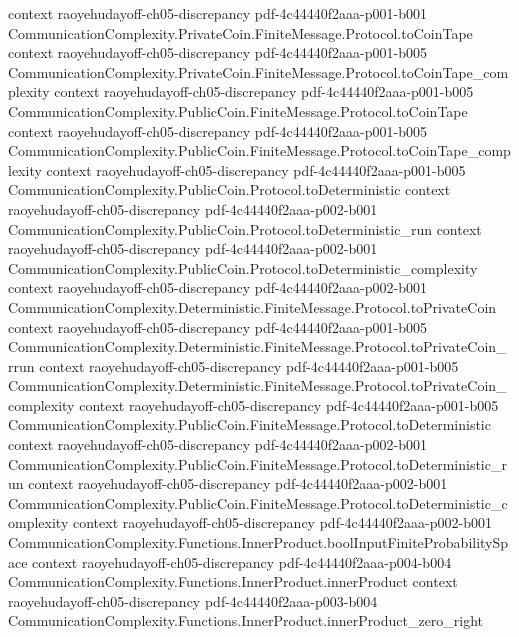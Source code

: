\begin{lemma}
  {context}
  {raoyehudayoff-ch05-discrepancy}
  {pdf-4c44440f2aaa-p001-b001}
\proofstep
  {CommunicationComplexity.PrivateCoin.FiniteMessage.Protocol.toCoinTape}
  {context}
  {raoyehudayoff-ch05-discrepancy}
  {pdf-4c44440f2aaa-p001-b005}
\proofstep
  {CommunicationComplexity.PrivateCoin.FiniteMessage.Protocol.toCoinTape_complexity}
  {context}
  {raoyehudayoff-ch05-discrepancy}
  {pdf-4c44440f2aaa-p001-b005}
\proofstep
  {CommunicationComplexity.PublicCoin.FiniteMessage.Protocol.toCoinTape}
  {context}
  {raoyehudayoff-ch05-discrepancy}
  {pdf-4c44440f2aaa-p001-b005}
\proofstep
  {CommunicationComplexity.PublicCoin.FiniteMessage.Protocol.toCoinTape_complexity}
  {context}
  {raoyehudayoff-ch05-discrepancy}
  {pdf-4c44440f2aaa-p001-b005}
\proofstep
  {CommunicationComplexity.PublicCoin.Protocol.toDeterministic}
  {context}
  {raoyehudayoff-ch05-discrepancy}
  {pdf-4c44440f2aaa-p002-b001}
\proofstep
  {CommunicationComplexity.PublicCoin.Protocol.toDeterministic_run}
  {context}
  {raoyehudayoff-ch05-discrepancy}
  {pdf-4c44440f2aaa-p002-b001}
\proofstep
  {CommunicationComplexity.PublicCoin.Protocol.toDeterministic_complexity}
  {context}
  {raoyehudayoff-ch05-discrepancy}
  {pdf-4c44440f2aaa-p002-b001}
\proofstep
  {CommunicationComplexity.Deterministic.FiniteMessage.Protocol.toPrivateCoin}
  {context}
  {raoyehudayoff-ch05-discrepancy}
  {pdf-4c44440f2aaa-p001-b005}
\proofstep
  {CommunicationComplexity.Deterministic.FiniteMessage.Protocol.toPrivateCoin_rrun}
  {context}
  {raoyehudayoff-ch05-discrepancy}
  {pdf-4c44440f2aaa-p001-b005}
\proofstep
  {CommunicationComplexity.Deterministic.FiniteMessage.Protocol.toPrivateCoin_complexity}
  {context}
  {raoyehudayoff-ch05-discrepancy}
  {pdf-4c44440f2aaa-p001-b005}
\proofstep
  {CommunicationComplexity.PublicCoin.FiniteMessage.Protocol.toDeterministic}
  {context}
  {raoyehudayoff-ch05-discrepancy}
  {pdf-4c44440f2aaa-p002-b001}
\proofstep
  {CommunicationComplexity.PublicCoin.FiniteMessage.Protocol.toDeterministic_run}
  {context}
  {raoyehudayoff-ch05-discrepancy}
  {pdf-4c44440f2aaa-p002-b001}
\proofstep
  {CommunicationComplexity.PublicCoin.FiniteMessage.Protocol.toDeterministic_complexity}
  {context}
  {raoyehudayoff-ch05-discrepancy}
  {pdf-4c44440f2aaa-p002-b001}
\proofstep
  {CommunicationComplexity.Functions.InnerProduct.boolInputFiniteProbabilitySpace}
  {context}
  {raoyehudayoff-ch05-discrepancy}
  {pdf-4c44440f2aaa-p004-b004}
\proofstep
  {CommunicationComplexity.Functions.InnerProduct.innerProduct}
  {context}
  {raoyehudayoff-ch05-discrepancy}
  {pdf-4c44440f2aaa-p003-b004}
\proofstep
  {CommunicationComplexity.Functions.InnerProduct.innerProduct_zero_right}

\end{lemma}
